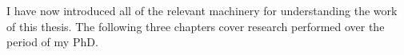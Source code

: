 
I have now introduced all of the relevant machinery for understanding the work of this thesis. The following three chapters cover research performed over the period of my PhD.
